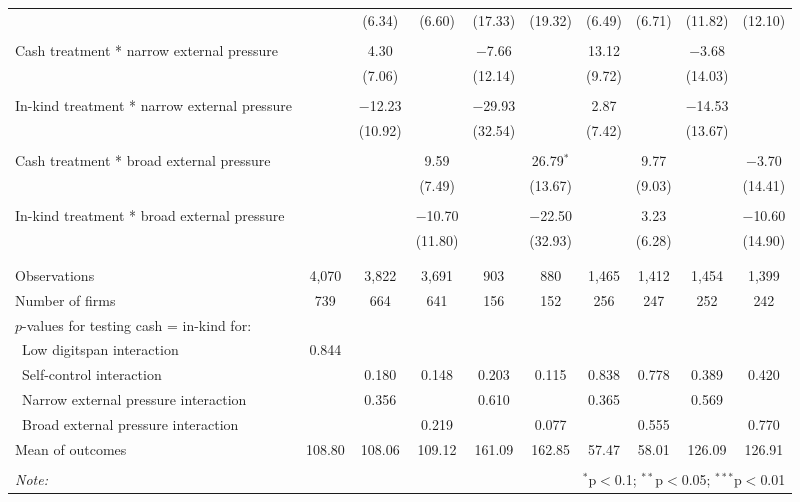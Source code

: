 \documentclass{report}
\begin{document}
\begin{table}[!htbp]
\begin{tabular}{@{\extracolsep{5pt}}lccccccccc}
  &  & (6.34) & (6.60) & (17.33) & (19.32) & (6.49) & (6.71) & (11.82) & (12.10) \\ 
  & & & & & & & & & \\ 
 Cash treatment * narrow external pressure &  & 4.30 &  & $-$7.66 &  & 13.12 &  & $-$3.68 &  \\ 
  &  & (7.06) &  & (12.14) &  & (9.72) &  & (14.03) &  \\ 
  & & & & & & & & & \\ 
 In-kind treatment * narrow external pressure &  & $-$12.23 &  & $-$29.93 &  & 2.87 &  & $-$14.53 &  \\ 
  &  & (10.92) &  & (32.54) &  & (7.42) &  & (13.67) &  \\ 
  & & & & & & & & & \\ 
 Cash treatment * broad external pressure &  &  & 9.59 &  & 26.79$^{*}$ &  & 9.77 &  & $-$3.70 \\ 
  &  &  & (7.49) &  & (13.67) &  & (9.03) &  & (14.41) \\ 
  & & & & & & & & & \\ 
 In-kind treatment * broad external pressure &  &  & $-$10.70 &  & $-$22.50 &  & 3.23 &  & $-$10.60 \\ 
  &  &  & (11.80) &  & (32.93) &  & (6.28) &  & (14.90) \\ 
  & & & & & & & & & \\ 
\hline \\[-1.8ex] 
Observations & 4,070 & 3,822 & 3,691 & 903 & 880 & 1,465 & 1,412 & 1,454 & 1,399 \\ 
Number of firms & 739 & 664 & 641 & 156 & 152 & 256 & 247 & 252 & 242 \\ 
$p$-values for testing cash = in-kind for: &  &  &  &  &  &  &  &  &  \\ 
\ Low digitspan interaction & 0.844 &  &  &  &  &  &  &  &  \\ 
\ Self-control interaction &  & 0.180 & 0.148 & 0.203 & 0.115 & 0.838 & 0.778 & 0.389 & 0.420 \\ 
\ Narrow external pressure interaction &  & 0.356 &  & 0.610 &  & 0.365 &  & 0.569 &  \\ 
\ Broad external pressure interaction &  &  & 0.219 &  & 0.077 &  & 0.555 &  & 0.770 \\ 
Mean of outcomes & 108.80 & 108.06 & 109.12 & 161.09 & 162.85 & 57.47 & 58.01 & 126.09 & 126.91 \\ 
\hline \\[-1.8ex] 
\textit{Note:}  & \multicolumn{9}{r}{$^{*}$p$<$0.1; $^{**}$p$<$0.05; $^{***}$p$<$0.01} \\ 
\end{tabular} 
\end{table} 
\end{document}
